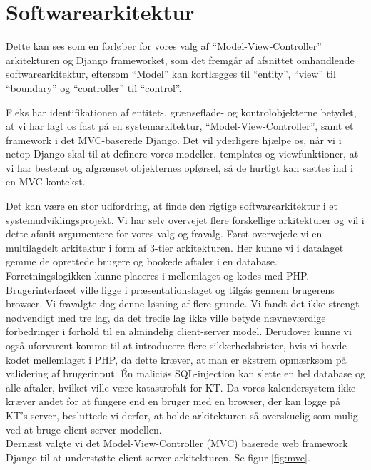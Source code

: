 \documentclass[12pt]{article}   %
\begin{document}
\section{Softwarearkitektur}

Dette kan 
ses som en forløber for vores valg af ``Model-View-Controller'' 
arkitekturen og Django frameworket, som det fremgår af afsnittet omhandlende 
softwarearkitektur, eftersom ``Model'' kan kortlægges til ``entity'', ``view''
til ``boundary'' og ``controller'' til ``control''.


F.eks har identifikationen 
af entitet-, grænseflade- og kontrolobjekterne betydet, at vi har lagt os fast
på en systemarkitektur, ``Model-View-Controller'', samt et framework i det
MVC-baserede Django. Det vil yderligere hjælpe os, når vi i netop Django skal
til at definere vores modeller, templates og viewfunktioner, at vi har bestemt
og afgrænset objekternes opførsel, så de hurtigt kan sættes ind i en MVC
kontekst.



Det kan være en stor udfordring, at finde den rigtige softwarearkitektur i et
systemudviklingsprojekt. Vi har selv overvejet flere forskellige arkitekturer 
og vil i dette afsnit argumentere for vores valg og fravalg. Først overvejede
vi en multilagdelt arkitektur i form af 3-tier arkitekturen. Her kunne vi i
datalaget gemme de oprettede brugere og bookede aftaler i en database.
Forretningslogikken kunne placeres i mellemlaget og kodes med PHP.
Brugerinterfacet ville ligge i præsentationslaget og tilgås gennem brugerens
browser. Vi fravalgte dog denne løsning af flere grunde. Vi fandt det ikke
strengt nødvendigt med tre lag, da det tredie lag ikke ville betyde
nævneværdige forbedringer i forhold til en almindelig client-server model.
Derudover kunne vi også uforvarent komme til at introducere flere
sikkerhedsbrister, hvis vi havde kodet mellemlaget i PHP, da dette kræver, at 
man er ekstrem opmærksom på validering af brugerinput. Én maliciøs SQL-injection
kan slette en hel database og alle aftaler, hvilket ville være katastrofalt for
KT. Da vores kalendersystem ikke kræver andet for at fungere end en bruger med
en browser, der kan logge på KT's server, besluttede vi derfor, at holde 
arkitekturen så overskuelig som mulig ved at bruge client-server modellen. \\
Dernæst valgte vi det Model-View-Controller (MVC) baserede web framework Django til
at understøtte client-server arkitekturen. Se figur \ref{fig:mvc}.\\
\end{document}
